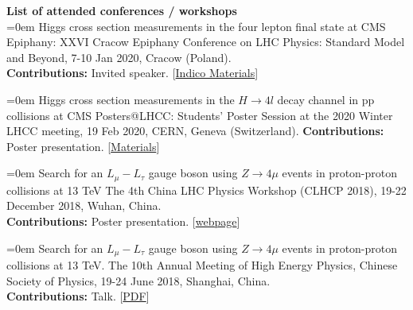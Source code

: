 \newcommand{\MarginText}[1]{\marginpar{\raggedleft\itshape\small#1}}
\newcommand{\NewPublication}[4]{\noindent\hangindent=0em\hangafter=0 \MarginText{\color{black} #1}{\footnotesize [{\color{blue}#2}]} #3 {\footnotesize\color{ballblue}#4}\vspace{0.5em}}

\large\textbf{\color{electricultramarine} List of attended conferences / workshops}\\


\NewPublication{}{5}{Higgs cross section measurements in the four lepton final state at CMS}{%
Epiphany: XXVI Cracow Epiphany Conference on LHC Physics: Standard Model and Beyond, 7-10 Jan 2020, Cracow (Poland).\\
\textbf{Contributions:} Invited speaker.
[\href{https://indico.cern.ch/event/819524/contributions/3683314/attachments/1966862/3270750/Higgs_XS_H4L_CMS_TahirJavaid_final.pdf}{Indico Materials}]}

\NewPublication{}{4}{Higgs cross section measurements in the $H\rightarrow 4l$ decay channel in pp collisions at CMS}{%
Posters@LHCC: Students' Poster Session at the 2020 Winter LHCC meeting, 19 Feb 2020, CERN, Geneva (Switzerland).\newline
\textbf{Contributions:} Poster presentation.
[\href{https://cms-mgt-conferences.web.cern.ch/conferences/pres_display.aspx?cid=2828&pid=21410}{Materials}]}

\NewPublication{}{3}{Search for an  $L_{\mu}- L_{\tau}$ gauge boson using $Z\rightarrow 4\mu$ events in proton-proton collisions at 13 TeV}{%
        The 4th China LHC Physics Workshop (CLHCP 2018), 19-22 December 2018, Wuhan, China.\\
	\textbf{Contributions:} Poster presentation.
[\href{https://indico.ihep.ac.cn/event/8414/page/6}{webpage}]}

\NewPublication{}{2(a)}{Search for an  $L_{\mu}- L_{\tau}$ gauge boson using $Z\rightarrow 4\mu$ events in proton-proton collisions at 13 TeV.}{%
The 10th Annual Meeting of High Energy Physics, Chinese Society of Physics, 19-24 June 2018, Shanghai, China.\\
\textbf{Contributions:} Talk.
[\href{https://indico.ihep.ac.cn/event/7352/session/5/contribution/391/material/slides/0.pdf}{PDF}]}

